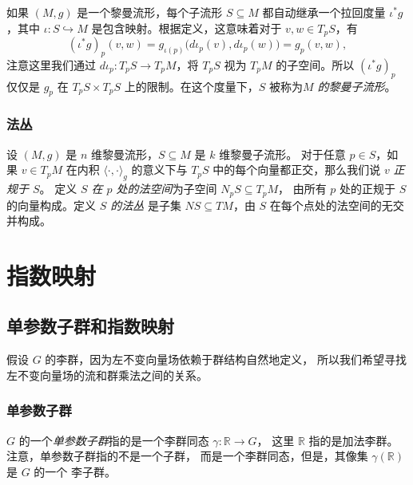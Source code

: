 \documentclass[fontset=none]{Notes}
\begin{document}
如果 $(M,g)$ 是一个黎曼流形，每个子流形 $S\subseteq M$
都自动继承一个拉回度量 $\iota^*g$，其中 $\iota:S\hookrightarrow M$
是包含映射。根据定义，这意味着对于 $v,w\in T_pS$，有
\[
  (\iota^*g)_p(v,w)=g_{\iota(p)}\bigl(d\iota_p(v),d\iota_p(w)\bigr)
  =g_p(v,w),
\]
注意这里我们通过 $d\iota_p:T_pS\to T_pM$，将 $T_pS$ 视为 $T_pM$
的子空间。所以 $(\iota^*g)_p$ 仅仅是 $g_p$ 在 $T_pS\times T_pS$
上的限制。在这个度量下，$S$ 被称为\emph{$M$ 的黎曼子流形}。

\subsection{法丛}

设 $(M,g)$ 是 $n$ 维黎曼流形，$S\subseteq M$ 是 $k$ 维黎曼子流形。
对于任意 $p\in S$，如果 $v\in T_pM$ 在内积 $\langle\cdot,\cdot\rangle_g$
的意义下与 $T_pS$ 中的每个向量都正交，那么我们说 $v$ \emph{正规于 $S$}。
定义 \emph{$S$ 在 $p$ 处的法空间}为子空间 $N_pS\subseteq T_pM$，
由所有 $p$ 处的正规于 $S$ 的向量构成。定义 \emph{$S$ 的法丛}
是子集 $NS\subseteq TM$，由 $S$ 在每个点处的法空间的无交并构成。


\chapter{指数映射}

\section{单参数子群和指数映射}

假设 $G$ 的李群，因为左不变向量场依赖于群结构自然地定义，
所以我们希望寻找左不变向量场的流和群乘法之间的关系。

\subsection{单参数子群}

$G$ 的一个\emph{单参数子群}指的是一个李群同态 $\gamma:\mathbb{R}\to G$，
这里 $\mathbb{R}$ 指的是加法李群。注意，单参数子群指的不是一个子群，
而是一个李群同态，但是，其像集 $\gamma(\mathbb{R})$ 是 $G$ 的一个
李子群。
\end{document}
